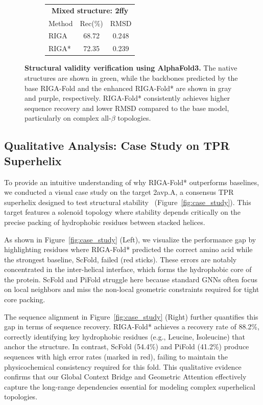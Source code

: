 \documentclass{article}
\theoremstyle{plain}
\theoremstyle{definition}
\theoremstyle{remark}
\begin{document}
{\begin{figure}[t!]
\begin{subfigure}{0.325\textwidth}
        \footnotesize 
        \begin{tabular}{lcc}
            \multicolumn{3}{c}{\textbf{Mixed structure: 2ffy}} \\ 
            Method & Rec(\%) & RMSD \\
            RIGA & 68.72 & 0.248 \\
            RIGA* & 72.35 & 0.239
        \end{tabular}
        \label{fig:2ffy}
    \end{subfigure}
    
    \caption{\textbf{Structural validity verification using AlphaFold3.} 
    The native structures are shown in green, 
    while the backbones predicted by the base RIGA-Fold and the enhanced RIGA-Fold* are shown in gray and purple, respectively. 
    RIGA-Fold* consistently achieves higher sequence recovery and lower RMSD compared to the base model, particularly on complex all-$\beta$ topologies.}
    \label{fig:structure_results} 
\end{figure}



\subsection{Qualitative Analysis: Case Study on TPR Superhelix}

To provide an intuitive understanding of why RIGA-Fold* outperforms baselines, we conducted a visual case study on the target 2avp.A, a consensus TPR superhelix designed to test structural stability~\cite{main_eriks_2003} (Figure~\ref{fig:case_study}). This target features a solenoid topology where stability depends critically on the precise packing of hydrophobic residues between stacked helices.

As shown in Figure~\ref{fig:case_study} (Left), we visualize the performance gap by highlighting residues where RIGA-Fold* predicted the correct amino acid while the strongest baseline, ScFold, failed (red sticks). These errors are notably concentrated in the inter-helical interface, which forms the hydrophobic core of the protein. ScFold and PiFold struggle here because standard GNNs often focus on local neighbors and miss the non-local geometric constraints required for tight core packing.

The sequence alignment in Figure~\ref{fig:case_study} (Right) further quantifies this gap in terms of sequence recovery. RIGA-Fold* achieves a recovery rate of 88.2\%, correctly identifying key hydrophobic residues (e.g., Leucine, Isoleucine) that anchor the structure. In contrast, ScFold (54.4\%) and PiFold (41.2\%) produce sequences with high error rates (marked in red), failing to maintain the physicochemical consistency required for this fold. This qualitative evidence confirms that our Global Context Bridge and Geometric Attention effectively capture the long-range dependencies essential for modeling complex superhelical topologies.



}
\end{document}
